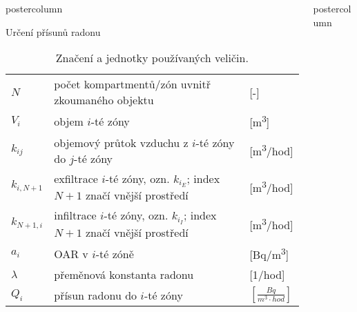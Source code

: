 \documentclass{beamer}
\newlength{\columnheight}
\begin{document}
\begin{frame}
\begin{columns}
\begin{column}{.43\textwidth}
\begin{beamercolorbox}[center]{postercolumn}
\begin{minipage}{.98\textwidth}
{\begin{myblock}{Určení přísunů radonu}
\begin{table}[h]
\def\arraystretch{1.1}
\scriptsize
    \centering
    \caption{Značení a jednotky používaných veličin.}
    \label{tab:veliciny}
    \begin{tabular}{lp{}l}
        \toprule
        $N$   & počet kompartmentů/zón uvnitř zkoumaného objektu&[-]\\
        $V_i$ & objem $i$-té zóny& [\si{m^3}] \\
        $k_{ij}$ & objemový průtok vzduchu z $i$-té zóny do $j$-té zóny& [\si{m^3/hod}]\\
        $k_{i, N+1}$ & exfiltrace $i$-té zóny, ozn. $k_{i_E}$; index $N+1$ značí vnější prostředí & [\si{m^3/hod}]\\
        $k_{N+1, i}$ & infiltrace $i$-té zóny, ozn. $k_{i_I}$; index $N+1$ značí vnější prostředí &[\si{m^3/hod}]\\
        $a_i$ & OAR v $i$-té zóně& [\si{Bq/m^3}] \\
        $\lambda$ & přeměnová konstanta radonu& [\si{1/hod}]\\
        $Q_i$ & přísun radonu do $i$-té zóny& $\left[\si{\frac{Bq}{m^3\cdot hod}}\right]$ \\
        \bottomrule
    \end{tabular}
\end{table}
\end{myblock}\vfill

		}\end{minipage}\end{beamercolorbox}
	\end{column}



	\begin{column}{.57\textwidth}
		\begin{beamercolorbox}[center]{postercolumn}
			\begin{minipage}{.98\textwidth} %
				\parbox[t][\columnheight]{\textwidth}{ %


}
\end{minipage}
\end{beamercolorbox}
\end{column}
\end{columns}
\end{frame}
\end{document}
